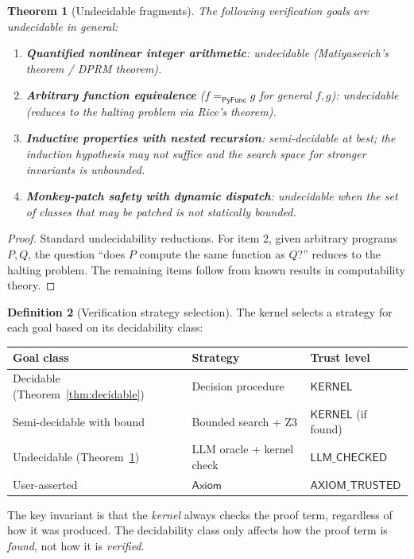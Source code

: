 \documentclass[11pt,a4paper]{report}
\theoremstyle{definition}
\newtheorem{definition}{Definition}[chapter]
\theoremstyle{plain}
\newtheorem{theorem}[definition]{Theorem}
\newcommand{\PyFunc}{\mathsf{PyFunc}}
\begin{document}
\begin{theorem}[Undecidable fragments]
\label{thm:undecidable}
The following verification goals are undecidable in general:
\begin{enumerate}
  \item \textbf{Quantified nonlinear integer arithmetic}: undecidable
    (Matiyasevich's theorem / DPRM theorem).
  \item \textbf{Arbitrary function equivalence}
    ($f =_{\PyFunc} g$ for general $f, g$):
    undecidable (reduces to the halting problem via Rice's theorem).
  \item \textbf{Inductive properties with nested recursion}:
    semi-decidable at best; the induction hypothesis may not
    suffice and the search space for stronger invariants is
    unbounded.
  \item \textbf{Monkey-patch safety with dynamic dispatch}:
    undecidable when the set of classes that may be patched is not
    statically bounded.
\end{enumerate}
\end{theorem}
\begin{proof}
Standard undecidability reductions. For item 2, given arbitrary
programs $P, Q$, the question ``does $P$ compute the same function as
$Q$?'' reduces to the halting problem. The remaining items follow from
known results in computability theory.
\end{proof}

\begin{definition}[Verification strategy selection]
\label{def:strategy-selection}
The kernel selects a strategy for each goal based on its decidability
class:
\begin{center}
\begin{tabular}{lll}
  \toprule
  \textbf{Goal class} & \textbf{Strategy} & \textbf{Trust level} \\
  \midrule
  Decidable (Theorem~\ref{thm:decidable}) &
    Decision procedure & $\mathsf{KERNEL}$ \\
  Semi-decidable with bound &
    Bounded search + Z3 & $\mathsf{KERNEL}$ (if found) \\
  Undecidable (Theorem~\ref{thm:undecidable}) &
    LLM oracle + kernel check & $\mathsf{LLM\_CHECKED}$ \\
  User-asserted &
    $\mathsf{Axiom}$ & $\mathsf{AXIOM\_TRUSTED}$ \\
  \bottomrule
\end{tabular}
\end{center}
The key invariant is that the \emph{kernel} always checks the proof
term, regardless of how it was produced. The decidability class only
affects how the proof term is \emph{found}, not how it is
\emph{verified}.
\end{definition}
\end{document}
